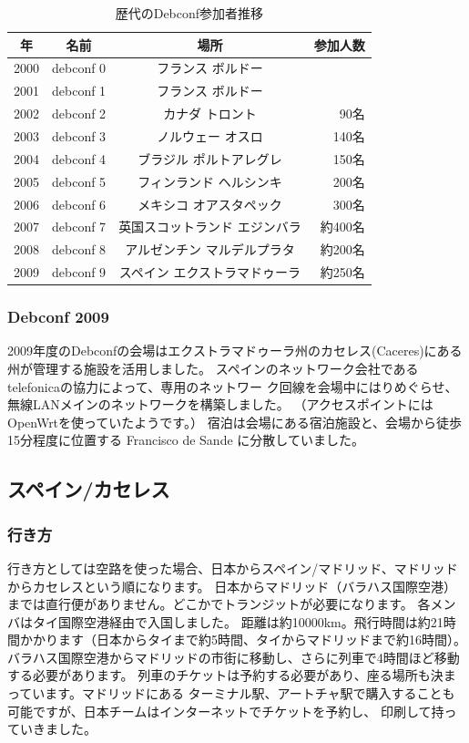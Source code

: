 \documentclass[mingoth,a4paper]{jsarticle}
\begin{document}
\begin{table}[H]
\caption{歴代のDebconf参加者推移}
\label{tab:debconflist}
 \begin{center}
 {\footnotesize
 \begin{tabular}{|c|c|c|r|}
 \hline
 年 & 名前 & 場所 & 参加人数 \\
 \hline
 2000 & debconf 0 &フランス ボルドー & \\
 2001 & debconf 1 &フランス ボルドー & \\
 2002 & debconf 2 &カナダ トロント & 90名 \\
 2003 & debconf 3 &ノルウェー オスロ & 140名 \\
 2004 & debconf 4 &ブラジル ポルトアレグレ &  150名 \\
 2005 & debconf 5 &フィンランド ヘルシンキ & 200名 \\
 2006 & debconf 6 &メキシコ オアスタペック & 300名 \\
 2007 & debconf 7 &英国スコットランド エジンバラ & 約400名 \\
 2008 & debconf 8 &アルゼンチン マルデルプラタ & 約200名 \\               
 2009 & debconf 9 &スペイン エクストラマドゥーラ & 約250名 \\
 \hline
 \end{tabular}
 }
 \end{center}
\end{table}

\subsubsection{Debconf 2009}

2009年度のDebconfの会場はエクストラマドゥーラ州のカセレス(Caceres)にある
州が管理する施設を活用しました。
スペインのネットワーク会社であるtelefonicaの協力によって、専用のネットワー
ク回線を会場中にはりめぐらせ、無線LANメインのネットワークを構築しました。
（アクセスポイントにはOpenWrtを使っていたようです。）
宿泊は会場にある宿泊施設と、会場から徒歩15分程度に位置する Francisco de Sande に分散していました。

\subsection{スペイン/カセレス}

\subsubsection{行き方}
  行き方としては空路を使った場合、日本からスペイン/マドリッド、マドリッドからカセレスという順になります。
  日本からマドリッド（バラハス国際空港）までは直行便がありません。どこかでトランジットが必要になります。
  各メンバはタイ国際空港経由で入国しました。
  距離は約10000km。飛行時間は約21時間かかります（日本からタイまで約5時間、タイからマドリッドまで約16時間）。
  バラハス国際空港からマドリッドの市街に移動し、さらに列車で4時間ほど移動する必要があります。
  列車のチケットは予約する必要があり、座る場所も決まっています。マドリッドにある
  ターミナル駅、アートチャ駅で購入することも可能ですが、日本チームはインターネットでチケットを予約し、
  印刷して持っていきました。
\end{document}
